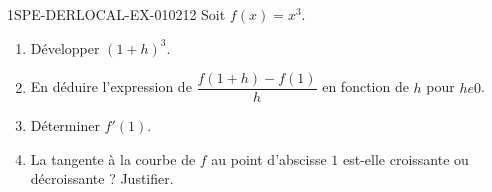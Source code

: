 \begin{exercice}{1SPE-DERLOCAL-EX-010}{2}{12}
Soit $f(x)=x^3$.
\begin{enumerate}
  \item Développer $(1+h)^3$.
  \item En déduire l'expression de $\dfrac{f(1+h)-f(1)}{h}$ en fonction de $h$ pour $h
e 0$.
  \item Déterminer $f'(1)$.
  \item La tangente à la courbe de $f$ au point d'abscisse $1$ est-elle croissante ou décroissante ? Justifier.
\end{enumerate}
\end{exercice}
